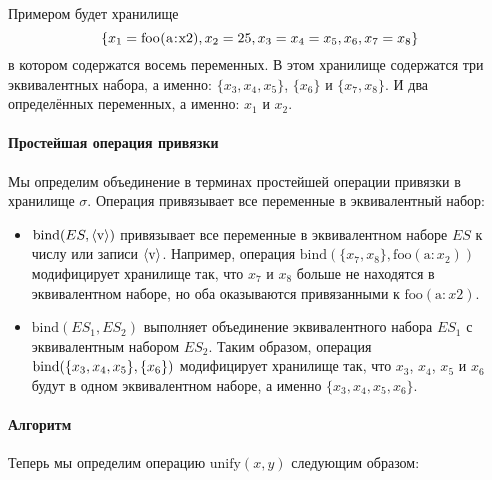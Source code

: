 Примером будет хранилище
$$\{x_1= \text{\lstinline!foo(a:x2)!}, x_2=25, x_3=x_4=x_5, x_6, x_7=x_8\}$$
в котором содержатся восемь переменных. В этом хранилище содержатся три эквивалентных набора, а именно: $\{x_3, x_4, x_5\}$, $\{x_6\}$ и $\{x_7, x_8\}$. И два определённых переменных, а именно: $x_1$ и $x_2$.

\paragraph{Простейшая операция привязки}

Мы определим объединение в терминах простейшей операции привязки в хранилище $\sigma$. Операция привязывает все переменные в эквивалентный набор:

\begin{itemize}

  \item{$\text{bind}(ES, \langle \text{\lstinline!v!} \rangle)$ привязывает все переменные в эквивалентном наборе $ES$ к числу или записи $\langle \text{\lstinline!v!} \rangle$. Например, операция $\text{bind}(\{x_7, x_8\}, \text{foo}(\text{a}:x_2))$ модифицирует хранилище так, что $x_7$ и $x_8$ больше не находятся в эквивалентном наборе, но оба оказываются привязанными к $\text{foo}(\text{a}:x2)$.}

\item{$\text{bind}(ES_1, ES_2)$ выполняет объединение эквивалентного набора $ES_1$ с эквивалентным набором $ES_2$. Таким образом, операция $\text{bind}  ( \\ \{x_3, x_4, x_5\}, \{x_6\} )$ модифицирует хранилище так, что $x_3$, $x_4$, $x_5$ и $x_6$ будут в одном эквивалентном наборе, а именно $\{x_3, x_4, x_5, x_6\}$.}
\end{itemize}

\paragraph{Алгоритм}

Теперь мы определим операцию $\text{unify}(x, y)$ следующим образом:

